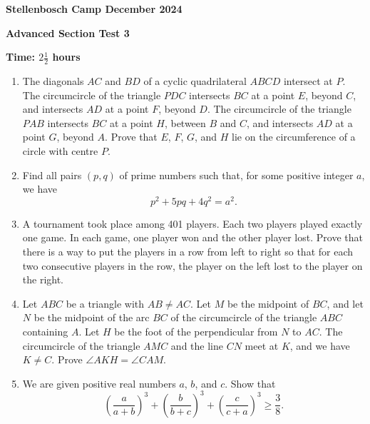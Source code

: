\documentclass[12pt]{article}
\begin{document}
\begin{center} \large
    \textbf{Stellenbosch Camp December 2024}
    
    \textbf{Advanced Section Test 3}
    
    \textbf{Time: \(2 \frac{1}{2}\) hours}
\end{center}

\begin{enumerate}[topsep=2\bigskipamount,itemsep=\bigskipamount]
\item The diagonals $AC$ and $BD$ of a cyclic quadrilateral $ABCD$ intersect at $P$. The circumcircle of the triangle $PDC$ intersects $BC$ at a point $E$, beyond $C$, and intersects $AD$ at a point $F$, beyond $D$. The circumcircle of the triangle $PAB$ intersects $BC$ at a point $H$, between $B$ and $C$, and intersects $AD$ at a point $G$, beyond $A$. Prove that $E$, $F$, $G$, and $H$ lie on the circumference of a circle with centre $P$.
\item Find all pairs \((p, q)\) of prime numbers such that, for some positive integer \(a\), we have
\[p^{2} + 5pq + 4q^{2} = a^{2}.\]
\item A tournament took place among 401 players. Each two players played exactly one game. In each game, one player won and the other player lost. Prove that there is a way to put the players in a row from left to right so that for each two consecutive players in the row, the player on the left lost to the player on the right.
\item Let \(ABC\) be a triangle with \(AB \neq AC\). Let \(M\) be the midpoint of \(BC\), and let \(N\) be the midpoint of the arc \(BC\) of the circumcircle of the triangle \(ABC\) containing \(A\). Let \(H\) be the foot of the perpendicular from \(N\) to \(AC\). The circumcircle of the triangle \(AMC\) and the line \(CN\) meet at \(K\), and we have \(K \neq C\). Prove \(\angle AKH = \angle CAM\).
\item We are given positive real numbers \(a\), \(b\), and \(c\). Show that
\[\left(\frac{a}{a + b}\right)^{3} + \left(\frac{b}{b + c}\right)^{3} + \left(\frac{c}{c + a}\right)^{3} \geqslant \frac{3}{8}.\]
\end{enumerate}
\end{document}
